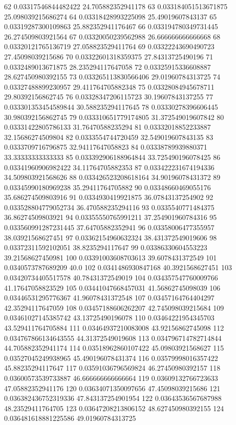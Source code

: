 {62 0.03317546844482422 24.705882352941178
63 0.033184051513671875 25.098039215686274
64 0.03318428993225098 25.49019607843137
65 0.03319287300109863 25.882352941176467
66 0.033194780349731445 26.274509803921564
67 0.03320050239562988 26.666666666666668
68 0.03320121765136719 27.058823529411764
69 0.03322243690490723 27.45098039215686
70 0.03322601318359375 27.84313725490196
71 0.0332489013671875 28.235294117647058
72 0.03325915336608887 28.627450980392155
73 0.033265113830566406 29.01960784313725
74 0.03327488899230957 29.411764705882348
75 0.03328084945678711 29.80392156862745
76 0.03328347206115723 30.19607843137255
77 0.033301353454589844 30.588235294117645
78 0.03330278396606445 30.980392156862745
79 0.033310651779174805 31.372549019607842
80 0.03331422805786133 31.76470588235294
81 0.03332018852233887 32.15686274509804
82 0.0333554744720459 32.549019607843135
83 0.0333709716796875 32.94117647058823
84 0.03338789939880371 33.33333333333333
85 0.033392906188964844 33.725490196078425
86 0.03341960906982422 34.11764705882353
87 0.033422231674194336 34.509803921568626
88 0.033426523208618164 34.90196078431372
89 0.03345990180969238 35.29411764705882
90 0.03348660469055176 35.686274509803916
91 0.0334930419921875 36.07843137254902
92 0.033528804779052734 36.470588235294116
93 0.0335540771484375 36.86274509803921
94 0.03355550765991211 37.254901960784316
95 0.033560991287231445 37.64705882352941
96 0.03358006477355957 38.03921568627451
97 0.03362154960632324 38.431372549019606
98 0.03372311592102051 38.8235294117647
99 0.03386330604553223 39.21568627450981
100 0.03391003608703613 39.6078431372549
101 0.0340573787689209 40.0
102 0.0341486930847168 40.3921568627451
103 0.03420734405517578 40.78431372549019
104 0.034357547760009766 41.17647058823529
105 0.03441047668457031 41.56862745098039
106 0.03446531295776367 41.96078431372548
107 0.03457164764404297 42.35294117647059
108 0.03457188606262207 42.745098039215684
109 0.03461027145385742 43.13725490196078
110 0.03464221954345703 43.529411764705884
111 0.03464937210083008 43.92156862745098
112 0.034767866134643555 44.31372549019608
113 0.034796714782714844 44.705882352941174
114 0.03518962860107422 45.09803921568627
115 0.03527045249938965 45.490196078431374
116 0.03579998016357422 45.88235294117647
117 0.03591036796569824 46.27450980392157
118 0.03600573539733887 46.666666666666664
119 0.03609132766723633 47.05882352941176
120 0.03634071350097656 47.45098039215686
121 0.036382436752319336 47.843137254901954
122 0.03643536567687988 48.23529411764705
123 0.03647208213806152 48.627450980392155
124 0.036481618881225586 49.01960784313725
}
